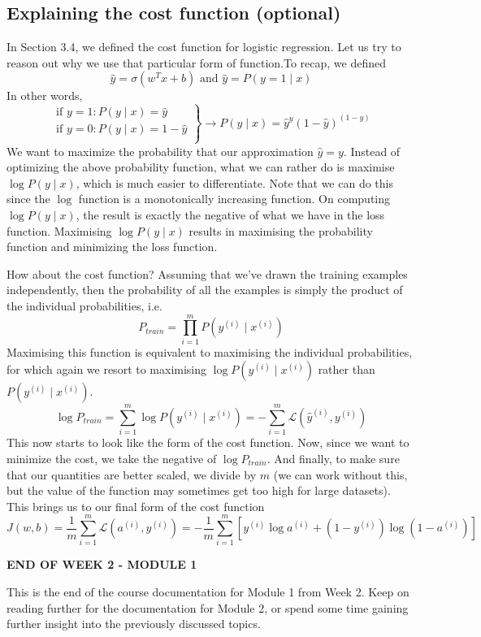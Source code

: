 \documentclass{article}[a4paper,12pt]
\theoremstyle{definition}
\newcommand{\Lagr}{\mathcal{L}}
\begin{document}
\subsection{Explaining the cost function (optional)}
In Section 3.4, we defined the cost function for logistic regression. Let us try to reason out why we use that particular form of function.To recap, we defined
$$\hat{y}=\sigma(w^Tx+b)\text{ and } \hat{y}=P(y=1\mid x)$$
In other words,
$$\left. \begin{array}{l}
    \text{if }y=1: P(y\mid x)=\hat{y} \\
    \text{if }y=0: P(y\mid x)=1-\hat{y} \\
\end{array}{} \right\}
\longrightarrow P(y\mid x)=\hat{y}^y(1-\hat{y})^{(1-y)}
$$
We want to maximize the probability that our approximation $\hat{y}=y$. Instead of optimizing the above probability function, what we can rather do is maximise $\log P(y\mid x)$, which is much easier to differentiate. Note that we can do this since the $\log$ function is a monotonically increasing function. On computing $\log P(y\mid x)$, the result is exactly the negative of what we have in the loss function. Maximising $\log P(y\mid x)$ results in maximising the probability function and minimizing the loss function.
\vspace{6pt}

How about the cost function? Assuming that we've drawn the training examples independently, then the probability of all the examples is simply the product of the individual probabilities, i.e.
$$P_{train} = \prod_{i=1}^m P(y^{(i)}\mid x^{(i)})$$
Maximising this function is equivalent to maximising the individual probabilities, for which again we resort to maximising $\log P(y^{(i)}\mid x^{(i)})$ rather than $P(y^{(i)}\mid x^{(i)})$.
$$\log P_{train}=\sum_{i=1}^{m}\log P(y^{(i)}\mid x^{(i)})=-\sum_{i=1}^{m}\Lagr(\hat{y}^{(i)},y^{(i)})$$
This now starts to look like the form of the cost function. Now, since we want to minimize the cost, we take the negative of $\log P_{train}$. And finally, to make sure that our quantities are better scaled, we divide by $m$ (we can work without this, but the value of the function may sometimes get too high for large datasets). This brings us to our final form of the cost function
$$J(w,b)=\dfrac{1}{m}\sum_{i=1}^{m}\Lagr(a^{(i)},y^{(i)})=-\dfrac{1}{m}\sum_{i=1}^{m}\left[y^{(i)}\log a^{(i)}+(1-y^{(i)})\log(1-a^{(i)})\right]$$

\hrulefill
\begin{center}\textbf{END OF WEEK 2 - MODULE 1}\end{center}
This is the end of the course documentation for Module 1 from Week 2. Keep on reading further for the documentation for Module 2, or spend some time gaining further insight into the previously discussed topics.
\end{document}
